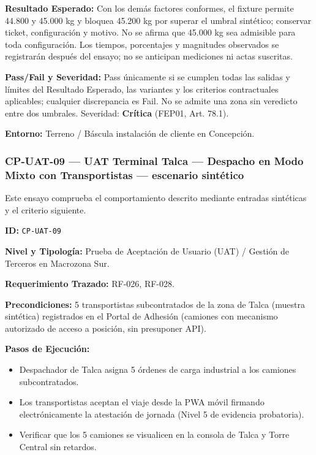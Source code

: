 \par\noindent\textbf{Resultado Esperado:} Con los demás factores conformes, el fixture permite 44.800 y 45.000 kg y bloquea 45.200 kg por superar el umbral sintético; conservar ticket, configuración y motivo. No se afirma que 45.000 kg sea admisible para toda configuración. Los tiempos, porcentajes y magnitudes observados se registrarán después del ensayo; no se anticipan mediciones ni actas suscritas.\par
\par\noindent\textbf{Pass/Fail y Severidad:} Pass únicamente si se cumplen todas las salidas y límites del Resultado Esperado, las variantes y los criterios contractuales aplicables; cualquier discrepancia es Fail. No se admite una zona sin veredicto entre dos umbrales. Severidad: \textbf{Crítica} (FEP01, Art. 78.1).\par
\par\noindent\textbf{Entorno:} Terreno / Báscula instalación de cliente en Concepción.\par






\subsubsection*{CP-UAT-09 — UAT Terminal Talca — Despacho en Modo Mixto con Transportistas — escenario sintético}\label{sec:9-cp-uat-09}

Este ensayo comprueba el comportamiento descrito mediante entradas sintéticas y el criterio siguiente.

\par\noindent\textbf{ID:} \texttt{CP-\allowbreak{}UAT-\allowbreak{}09}\par
\par\noindent\textbf{Nivel y Tipología:} Prueba de Aceptación de Usuario (UAT) / Gestión de Terceros en Macrozona Sur.\par
\par\noindent\textbf{Requerimiento Trazado:} RF-026, RF-028.\par
\par\noindent\textbf{Precondiciones:} 5 transportistas subcontratados de la zona de Talca (muestra sintética) registrados en el Portal de Adhesión (camiones con mecanismo autorizado de acceso a posición, sin presuponer API).\par
\par\noindent\textbf{Pasos de Ejecución:}\par
\begin{itemize}
\item Despachador de Talca asigna 5 órdenes de carga industrial a los camiones subcontratados.
\item Los transportistas aceptan el viaje desde la PWA móvil firmando electrónicamente la atestación de jornada (Nivel 5 de evidencia probatoria).
\item Verificar que los 5 camiones se visualicen en la consola de Talca y Torre Central sin retardos.
\end{itemize}

